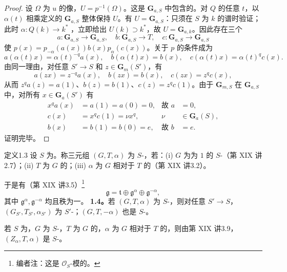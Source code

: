 \begin{proof}
设 $\Omega$ 为 $u$ 的像，$U=p^{-1}(\Omega)$。这是 $\mathbf G_{a,S}$ 中包含的。对 $Q$ 的任意 $t$，以 $\alpha(t)$ 相乘定义的 $\mathbf G_{a,S}$ 整体保持 $U$。有 $U=\mathbf G_{a,S}$：只须在 $S$ 为 $k$ 的谱时验证；此时 $\alpha:Q(k)\to k^*$ ，立即给出 $U(k)\supset k^*$，故 $U=\mathbf G_{a,k}$。因此存在三个
\[a:\mathbf G_{a,S}\to\mathbf G_{a,S},\quad b:\mathbf G_{a,S}\to T,\quad c:\mathbf G_{a,S}\to\mathbf G_{a,S}\]
使 $p(x)=p_{-\alpha}(a(x))b(x)p_\alpha(c(x))$。关于 $p$ 的条件成为
\[a(\alpha(t)x)=\alpha(t)^{-q}a(x),\quad b(\alpha(t)x)=b(x),\quad c(\alpha(t)x)=\alpha(t)^q c(x).\]
由同一理由，对任意 $S'\to S$ 和 $z\in\mathbf G_m(S')$，有
\[a(zx)=z^{-q}a(x),\quad b(zx)=b(x),\quad c(zx)=z^q c(x),\]
从而 $z^q a(z)=a(1)$、$b(z)=b(1)$、$c(z)=z^q c(1)$。由于 $\mathbf G_{m,S}$ 在 $\mathbf G_{a,S}$ 中，对所有 $x\in\mathbf G_a(S')$ 有
\[\begin{aligned}x^q a(x)&=a(1)=a(0)=0,&\text{故 }a&=0,\\c(x)&=x^q c(1)=\nu x^q,&\nu&\in\mathbf G_a(S),\\b(x)&=b(1)=b(0)=e,&\text{故 }b&=e.\end{aligned}\]
证明完毕。
\end{proof}
\begin{SGAresult}{定义}{1.3}
设 $S$ 为。称三元组 $(G,T,\alpha)$ 为 $S$-，若：(i) $G$ 为为 $1$ 的 $S$-（第 XIX 讲2.7）；(ii) $T$ 为 $G$ 的；(iii) $\alpha$ 为 $G$ 相对于 $T$ 的（第 XIX 讲3.2）。
\end{SGAresult}
于是有（第 XIX 讲3.5）\footnote{编者注：这是 $\mathscr O_S$-模的。}
\[\mathfrak g=\mathfrak t\oplus\mathfrak g^\alpha\oplus\mathfrak g^{-\alpha},\]
其中 $\mathfrak g^\alpha,\mathfrak g^{-\alpha}$ 均且秩为一。
\textbf{1.4。}若 $(G,T,\alpha)$ 为 $S$-，则对任意 $S'\to S$，$(G_{S'},T_{S'},\alpha_{S'})$ 为 $S'$-；$(G,T,-\alpha)$ 也是 $S$-。

若 $S$ 为，$G$ 为 $S$-，$T$ 为 $G$ 的，$\alpha$ 为 $G$ 相对于 $T$ 的，则由第 XIX 讲3.9，$(Z_\alpha,T,\alpha)$ 是 $S$-。

